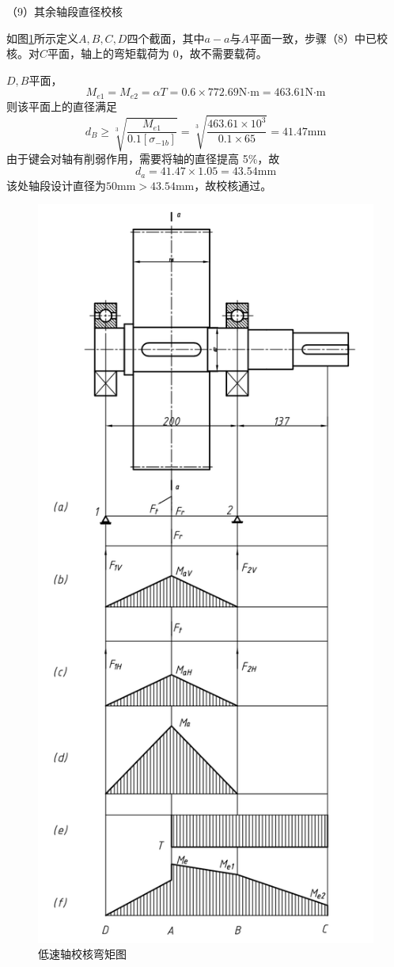 \documentclass[12pt]{ctexart}
\begin{document}
（9）其余轴段直径校核

如图\ref{figure11}所示定义$A,B,C,D$四个截面，其中$a-a$与$A$平面一致，步骤（8）中已校核。对$C$平面，轴上的弯矩载荷为 0，故不需要载荷。

$D,B$平面，
$$M_{e1}=M_{e2}=\alpha T=0.6\times 772.69\text{N·m}=463.61\text{N·m}$$
则该平面上的直径满足
$$d_B\ge \sqrt[3]{\frac{M_{e1}}{0.1[\sigma_{-1b}]}} = \sqrt[3]{\frac{463.61\times 10^3}{0.1\times 65}}=41.47\text{mm}$$
由于键会对轴有削弱作用，需要将轴的直径提高 5\%，故
$$d_a=41.47\times 1.05=43.54\text{mm}$$
该处轴段设计直径为$50\text{mm}> 43.54\text{mm}$，故校核通过。
\begin{figure}[htbp]
    \centering
    \includegraphics[scale = 0.4]{low_speed_roller.png}
    \caption{低速轴校核弯矩图}\label{figure11}
\end{figure}
\end{document}
